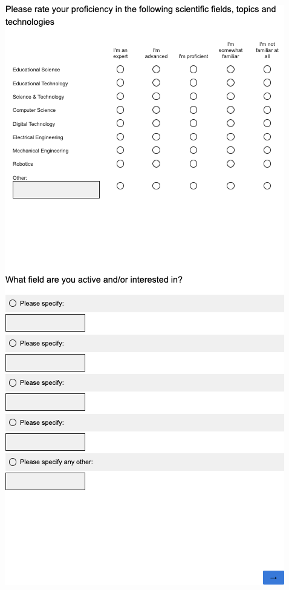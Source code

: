 \begin{multicols}{2}
\vfill
\includegraphics[width=.75\linewidth]{overleaf/images/q5.png}
\newpage

\end{multicols}
